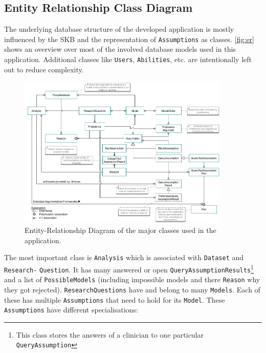 \subsection{Entity Relationship Class Diagram }
\label{sub:db}


The underlying database structure of the developed application is mostly influenced by the \gls{SKB} and the representation of \texttt{Assumptions} as classes. \autoref{fig:er} shows an overview over most of the involved database models used in this application. Additional classes like \texttt{Users}, \texttt{Abilities}, etc. are intentionally left out to reduce complexity. 

\begin{figure}
	\centering
	\includegraphics[width=0.9\textwidth]{figures/er_complete}
	\caption{Entity-Relationship Diagram of the major classes used in the application. }
	\label{fig:er}
\end{figure}


The most important class is \texttt{Analysis} which is associated with \texttt{Dataset} and \texttt{Research-} \texttt{Question}. It has many answered or open \texttt{QueryAssumptionResults}\footnote{This class stores the answers of a clinician to one particular \texttt{QueryAssumption}} and a list of \texttt{PossibleModels} (including impossible models and there \texttt{Reason} why they got rejected). \texttt{ResearchQuestions} have and belong to many \texttt{Models}. Each of these has multiple \texttt{Assumptions} that need to hold for its \texttt{Model}. These \texttt{Assumptions} have different specialisations: 

\bigskip

